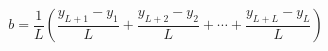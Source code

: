 

\[
b = \frac{1}{L} \left( \frac{y_{L+1} - y_{1}}{L} + \frac{y_{L+2} - y_{2}}{L} + \cdots + \frac{y_{L+L} - y_{L}}{L} \right)
\]


